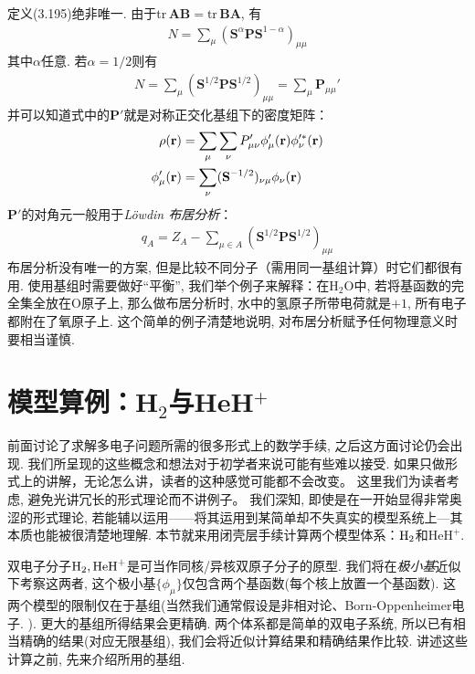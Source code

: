 定义(3.195)绝非唯一. 
由于$\mathrm{tr}\,\mathbf{AB}=\mathrm{tr}\,\mathbf{BA}$, 
有
\begin{align}
	N = \sum_\mu (\mathbf{S}^\alpha\mathbf{PS}^{1-\alpha})_{\mu\mu}
\end{align}
其中$\alpha$任意. 
若$\alpha=1/2$则有
\begin{align}
	\label{3.198}
	N = \sum_\mu (\mathbf{S}^{1/2}\mathbf{PS}^{1/2})_{\mu\mu} = \sum_\mu \mathbf{P}_{\mu\mu}'
\end{align}
并可以知道式中的$\mathbf{P}'$就是对称正交化基组下的密度矩阵：
\begin{align}
	\rho(\mathbf{r}) &= \sum_\mu\sum_\nu P'_{\mu\nu}\phi_\mu'(\mathbf{r})\phi_\nu^{\prime *}(\mathbf{r})\\
	\phi'_{\mu}(\mathbf{r}) &= \sum_\nu(\mathbf{S}^{-1/2})_{\nu\mu}\phi_\nu(\mathbf{r})
\end{align}
$\mathbf{P}'$的对角元一般用于\emph{L\"owdin 布居分析}：
\begin{align}
	q_A = Z_A - \sum_{\mu\in A}(\mathbf{S}^{1/2}\mathbf{PS}^{1/2})_{\mu\mu}
\end{align}
布居分析没有唯一的方案, 
但是比较不同分子（需用同一基组计算）时它们都很有用. 
使用基组时需要做好``平衡'', 
我们举个例子来解释：在$\mathrm{H}_2\mathrm{O}$中, 
若将基函数的完全集全放在$\mathrm{O}$原子上, 
那么做布居分析时, 
水中的氢原子所带电荷就是$+1$, 
所有电子都附在了氧原子上. 
这个简单的例子清楚地说明,
对布居分析赋予任何物理意义时要相当谨慎.

\section{模型算例：H$_2$与HeH$^+$}
前面讨论了求解多电子问题所需的很多形式上的数学手续, 
之后这方面讨论仍会出现. 
我们所呈现的这些概念和想法对于初学者来说可能有些难以接受. 如果只做形式上的讲解，无论怎么讲，读者的这种感觉可能都不会改变。
这里我们为读者考虑, 避免光讲冗长的形式理论而不讲例子。 
我们深知, 即使是在一开始显得非常奥涩的形式理论, 
若能辅以运用——将其运用到某简单却不失真实的模型系统上---其本质也能被很清楚地理解. 
本节就来用闭壳层\hft 手续计算两个模型体系：$\mathrm{H}_2$和$\mathrm{HeH}^+$.


双电子分子$\mathrm{H}_2,\mathrm{HeH}^+$是可当作同核/异核双原子分子的原型. 
我们将在\emph{极小基}近似下考察这两者, 
这个极小基$\{\phi_\mu\}$仅包含两个基函数(每个核上放置一个基函数). 
这两个模型的限制仅在于基组(当然我们通常假设是非相对论、Born-Oppenheimer电子\ha.
). 
更大的基组所得结果会更精确. 
两个体系都是简单的双电子系统, 
所以已有相当精确的结果(对应无限基组), 
我们会将近似计算结果和精确结果作比较. 
讲述这些计算之前, 
先来介绍所用的基组.

